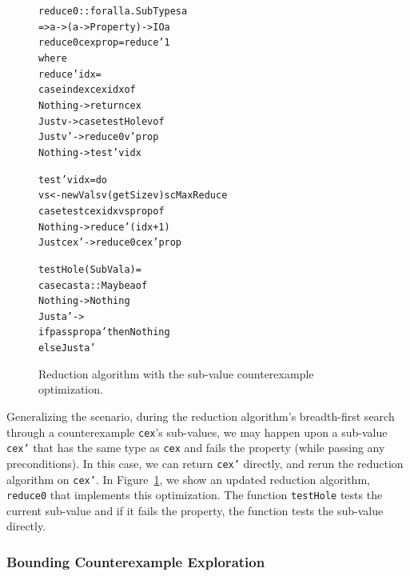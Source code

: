 \documentclass[10pt]{sigplanconf}
\newenvironment{code}{\begin{alltt}\small}{\end{alltt}}
\newcommand{\ttp}[1]{\texttt{#1}}
\begin{document}

\begin{figure}
\begin{code}
reduce0 :: forall a . SubTypes a
        => a -> (a -> Property) -> IO a
reduce0 cex prop = reduce' 1
  where
  reduce' idx =
    case index cex idx of
      Nothing -> return cex
      Just v  -> case testHole v of
                   Just v' -> reduce0 v' prop
                   Nothing -> test' v idx

  test' v idx = do
    vs <- newVals v (getSize v) scMaxReduce
    case test cex idx vs prop of
      Nothing   -> reduce' (idx+1)
      Just cex' -> reduce0 cex' prop

  testHole (SubVal a) =
    case cast a :: Maybe a of
      Nothing -> Nothing
      Just a' ->
        if pass prop a' then Nothing
          else Just a'
\end{code}
  \caption{Reduction algorithm with the sub-value counterexample optimization.}
  \label{fig:reduce0}
\end{figure}

Generalizing the scenario, during the reduction algorithm's breadth-first
search through a counterexample \ttp{cex}'s sub-values, we may happen upon a
sub-value \ttp{cex'} that has the same type as \ttp{cex} and fails the property
(while passing any preconditions).  In this case, we can return \ttp{cex'}
directly, and rerun the reduction algorithm on \ttp{cex'}.  In
Figure~\ref{fig:reduce0}, we show an updated reduction algorithm, \ttp{reduce0}
that implements this optimization.  The function \ttp{testHole} tests the
current sub-value and if it fails the property, the function tests the sub-value
directly.


\subsubsection{Bounding Counterexample Exploration}
\end{document}
